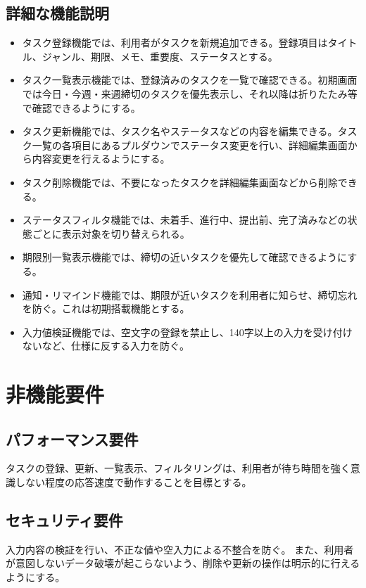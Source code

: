 \documentclass[dvipdfmx,10pt]{jarticle}
\begin{document}
    \subsection{詳細な機能説明}
    \begin{itemize}
        \item タスク登録機能では、利用者がタスクを新規追加できる。登録項目はタイトル、ジャンル、期限、メモ、重要度、ステータスとする。
        \item タスク一覧表示機能では、登録済みのタスクを一覧で確認できる。初期画面では今日・今週・来週締切のタスクを優先表示し、それ以降は折りたたみ等で確認できるようにする。
        \item タスク更新機能では、タスク名やステータスなどの内容を編集できる。タスク一覧の各項目にあるプルダウンでステータス変更を行い、詳細編集画面から内容変更を行えるようにする。
        \item タスク削除機能では、不要になったタスクを詳細編集画面などから削除できる。
        \item ステータスフィルタ機能では、未着手、進行中、提出前、完了済みなどの状態ごとに表示対象を切り替えられる。
        \item 期限別一覧表示機能では、締切の近いタスクを優先して確認できるようにする。
        \item 通知・リマインド機能では、期限が近いタスクを利用者に知らせ、締切忘れを防ぐ。これは初期搭載機能とする。
        \item 入力値検証機能では、空文字の登録を禁止し、140字以上の入力を受け付けないなど、仕様に反する入力を防ぐ。
    \end{itemize}

    \section{非機能要件}
    \label{sec:nonfunctional}
    \subsection{パフォーマンス要件}
    タスクの登録、更新、一覧表示、フィルタリングは、利用者が待ち時間を強く意識しない程度の応答速度で動作することを目標とする。

    \subsection{セキュリティ要件}
    入力内容の検証を行い、不正な値や空入力による不整合を防ぐ。
    また、利用者が意図しないデータ破壊が起こらないよう、削除や更新の操作は明示的に行えるようにする。
\end{document}
